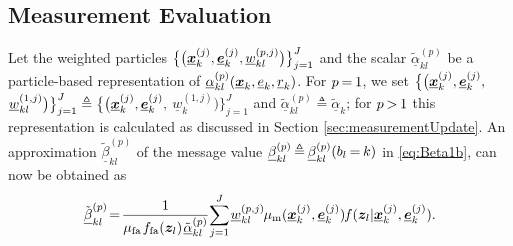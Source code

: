 \documentclass[10pt, twoside, romanappendices]{IEEEtran}
\providecommand{\ist}{\hspace*{.3mm}}
\providecommand{\rmv}{\hspace*{-.3mm}}
\providecommand{\nn}{\nonumber}
\begin{document}
\subsection{Measurement Evaluation}
\label{sec:meaEval}

Let the weighted \vspace{-.6mm} particles $\big\{ \big( \underline{\bm{x}}^{(j)}_{k}, \underline{\bm{e}}^{(j)}_{k}, \underline{w}^{(p,j)}_{kl} \big) \big\}_{j=1}^{J}$ and the scalar $\tilde{\underline{\alpha}}^{(p)}_{kl} $ be a particle-based representation of $\underline{\alpha}_{kl}^{(p)}(\underline{\bm{x}}_{k}, \underline{e}_{k}, \underline{r}_{k})$. For $p \rmv=\rmv 1$, we set  $\big\{ \big( \underline{\bm{x}}^{(j)}_{k}, \underline{\bm{e}}^{(j)}_{k},$ $\underline{w}^{(1,j)}_{kl} \big) \big\}_{j=1}^{J} \triangleq \big\{ \big( \underline{\bm{x}}^{(j)}_{k}, \underline{\bm{e}}^{(j)}_{k},$ $\underline{w}^{(1,j)}_{k} \big) \big\}_{j=1}^{J}$ and $\tilde{\underline{\alpha}}^{(p)}_{kl} \triangleq \tilde{\underline{\alpha}}_k$; for $p\rmv>\rmv1$\vspace{.5mm} this representation is calculated as discussed in Section \ref{sec:measurementUpdate}. An approximation $\tilde{\underline{\beta}}_{kl}^{(p)}$ of \vspace{.2mm} the message value $\underline{\beta}_{kl}^{(p)} \rmv\triangleq\rmv \underline{\beta}_{kl}^{(p)}(b_{l} \rmv=\rmv k)$ in \eqref{eq:Beta1b}, can now be obtained \vspace{.5mm} as
\begin{align}
\tilde{\underline{\beta}}_{kl}^{(p)} \rmv\rmv=\rmv\rmv \frac{1}{\mu_{\mathrm{fa}} \ist f_{\mathrm{fa}}(\V{z}_{l}) \ist \tilde{\underline{\alpha}}_{kl}^{(p)} } \rmv\rmv \sum^{J}_{j=1}  \rmv \underline{w}^{(p,j)}_{kl} \rmv \mu_{\mathrm{m}}(\underline{\V{x}}^{(j)}_k,\underline{\V{e}}^{(j)}_k) \rmv f(\V{z}_{l}| \underline{\V{x}}^{(j)}_k, \underline{\V{e}}^{(j)}_{k}). \nn\\[-3.5mm]
\nn
\end{align}
\end{document}
